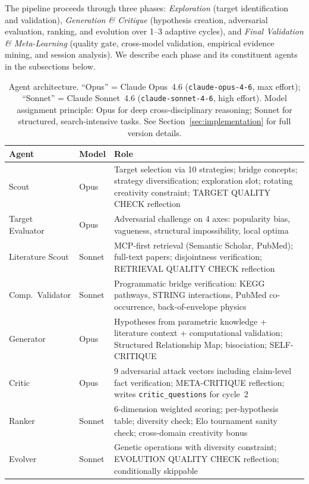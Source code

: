 The pipeline proceeds through three phases: \emph{Exploration} (target identification and validation), \emph{Generation \& Critique} (hypothesis creation, adversarial evaluation, ranking, and evolution over 1--3 adaptive cycles), and \emph{Final Validation \& Meta-Learning} (quality gate, cross-model validation, empirical evidence mining, and session analysis). We describe each phase and its constituent agents in the subsections below.

\begin{table}[t]
\centering
\caption{Agent architecture. ``Opus'' = Claude Opus~4.6 (\texttt{claude-opus-4-6}, max effort); ``Sonnet'' = Claude Sonnet~4.6 (\texttt{claude-sonnet-4-6}, high effort). Model assignment principle: Opus for deep cross-disciplinary reasoning; Sonnet for structured, search-intensive tasks. See Section~\ref{sec:implementation} for full version details.}
\label{tab:agents}
\small
\begin{tabular}{@{}llp{7.5cm}@{}}
\toprule
\textbf{Agent} & \textbf{Model} & \textbf{Role} \\
\midrule
Scout & Opus & Target selection via 10 strategies; bridge concepts; strategy diversification; exploration slot; rotating creativity constraint; TARGET QUALITY CHECK reflection \\
Target Evaluator & Opus & Adversarial challenge on 4 axes: popularity bias, vagueness, structural impossibility, local optima \\
Literature Scout & Sonnet & MCP-first retrieval (Semantic Scholar, PubMed); full-text papers; disjointness verification; RETRIEVAL QUALITY CHECK reflection \\
Comp.\ Validator & Sonnet & Programmatic bridge verification: KEGG pathways, STRING interactions, PubMed co-occurrence, back-of-envelope physics \\
Generator & Opus & Hypotheses from parametric knowledge + literature context + computational validation; Structured Relationship Map; bisociation; SELF-CRITIQUE \\
Critic & Opus & 9 adversarial attack vectors including claim-level fact verification; META-CRITIQUE reflection; writes \texttt{critic\_questions} for cycle~2 \\
Ranker & Sonnet & 6-dimension weighted scoring; per-hypothesis table; diversity check; Elo tournament sanity check; cross-domain creativity bonus \\
Evolver & Sonnet & Genetic operations with diversity constraint; EVOLUTION QUALITY CHECK reflection; conditionally skippable \\

\end{tabular}
\end{table}
